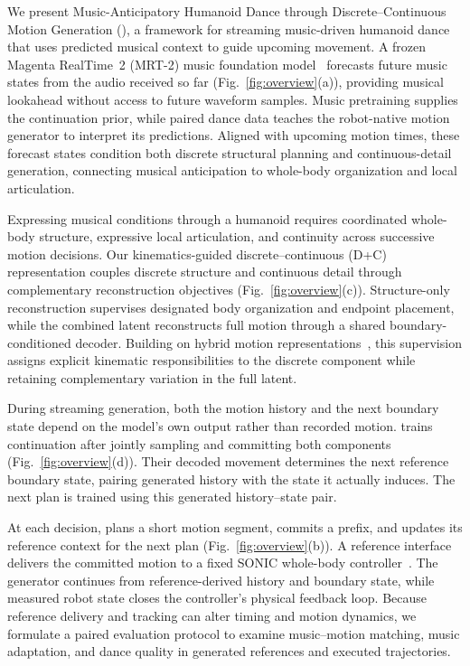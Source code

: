 We present Music-Anticipatory Humanoid Dance through
Discrete--Continuous Motion Generation (\method{}), a framework for streaming music-driven humanoid
dance that uses predicted musical context to guide upcoming movement.
A frozen Magenta RealTime~2 (MRT-2) music foundation
model~\cite{magenta2026mrt2} forecasts future music states from the
audio received so far (Fig.~\ref{fig:overview}(a)), providing musical
lookahead without access to future waveform samples.
Music pretraining supplies the continuation prior, while paired
dance data teaches the robot-native motion generator to interpret
its predictions.
Aligned with upcoming motion times, these forecast states condition
both discrete structural planning and continuous-detail generation,
connecting musical anticipation to whole-body organization and
local articulation.

Expressing musical conditions through a humanoid requires coordinated
whole-body structure, expressive local articulation, and continuity
across successive motion decisions.
Our kinematics-guided discrete--continuous (D+C) representation
couples discrete structure and continuous detail through complementary
reconstruction objectives (Fig.~\ref{fig:overview}(c)).
Structure-only reconstruction supervises designated body organization
and endpoint placement, while the combined latent reconstructs full
motion through a shared boundary-conditioned decoder.
Building on hybrid motion representations~\cite{wang2026dcmotion},
this supervision assigns explicit kinematic responsibilities to the
discrete component while retaining complementary variation in the
full latent.

During streaming generation, both the motion history and the next
boundary state depend on the model's own output rather than recorded
motion.
\cof{} trains continuation after jointly sampling and committing both
components (Fig.~\ref{fig:overview}(d)).
Their decoded movement determines the next reference boundary state,
pairing generated history with the state it actually induces.
The next plan is trained using this generated history--state pair.

At each decision, \method{} plans a short motion segment, commits
a prefix, and updates its reference context for the next plan
(Fig.~\ref{fig:overview}(b)).
A reference interface delivers the committed motion to a fixed
SONIC whole-body controller~\cite{luo2026sonic}.
The generator continues from reference-derived history and boundary
state, while measured robot state closes the controller's physical
feedback loop.
Because reference delivery and tracking can alter timing and motion
dynamics, we formulate a paired evaluation protocol to examine
music--motion matching, music adaptation, and dance quality
in generated references and executed trajectories.

